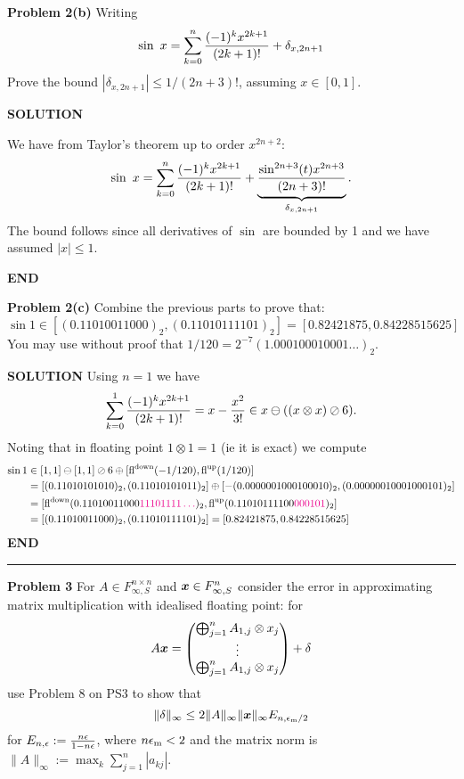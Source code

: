 \documentclass[12pt,a4paper]{article}
\def\x{ {\vc x} }
\def\magenta#1{ {\color{magenta} #1} }
\begin{document}
\textbf{Problem 2(b)} Writing
\[
\sin\ x = \ensuremath{\sum}_{k=0}^n {(-1)^k x^{2k+1} \over (2k+1)!} + \ensuremath{\delta}_{x,2n+1}
\]
Prove the bound $|\ensuremath{\delta}_{x,2n+1}| \ensuremath{\leq} 1/(2n+3)!$, assuming $x \ensuremath{\in} [0,1]$.

\textbf{SOLUTION}

We have from Taylor's theorem up to order $x^{2n+2}$:
\[
\sin\ x = \ensuremath{\sum}_{k=0}^n {(-1)^k x^{2k+1} \over (2k+1)!} + \underbrace{{\sin^{2n+3}(t) x^{2n+3} \over (2n+3)!}}_{\ensuremath{\delta}_{x,2n+1}}.
\]
The bound follows since all derivatives of $\sin$ are bounded by 1 and we have assumed $|x| \ensuremath{\leq} 1$.

\textbf{END}

\textbf{Problem 2(c)} Combine the previous parts to prove that:
\[
\sin 1 \ensuremath{\in} [(0.11010011000)_2, (0.11010111101)_2] = [0.82421875, 0.84228515625]
\]
You may use without proof that $1/120 = 2^{-7} (1.000100010001\ensuremath{\ldots})_2$.

\textbf{SOLUTION} Using $n = 1$ we have
\[
\ensuremath{\sum}_{k=0}^1 {(-1)^k x^{2k+1} \over (2k+1)!} = x - {x^2 \over 3!} \ensuremath{\in} x \ensuremath{\ominus} ((x \ensuremath{\otimes} x) \ensuremath{\oslash} 6).
\]
Noting that in floating point $1 \ensuremath{\otimes} 1 = 1$ (ie it is exact) we compute
\begin{align*}
\sin 1 &\ensuremath{\in} [1,1] \ensuremath{\ominus} [1,1] \ensuremath{\oslash} 6 \ensuremath{\oplus} [{\rm fl}^{\rm down}(-1/120), {\rm fl}^{\rm up}(1/120)] \ccr
 = [(0.11010101010)_2, (0.11010101011)_2] \ensuremath{\oplus} [-(0.0000001000100010)_2, (0.00000010001000101)_2] \ccr
  =
[{\rm fl}^{\rm down}(0.11010011000\magenta{11101111\ensuremath{\ldots}})_2,
 {\rm fl}^{\rm up}(0.11010111100\magenta{000101})_2] \ccr
 = [(0.11010011000)_2, (0.11010111101)_2] = [0.82421875, 0.84228515625]
\end{align*}
\textbf{END}

\rule{\textwidth}{1pt}
\textbf{Problem 3} For $A \ensuremath{\in} F_{\ensuremath{\infty},S}^{n \ensuremath{\times} n}$ and $\ensuremath{\bm{\x}} \ensuremath{\in} F_{\ensuremath{\infty},S}^n$ consider the error in approximating matrix multiplication with idealised floating point: for
\[
A \ensuremath{\bm{\x}} =  \begin{pmatrix}
\ensuremath{\bigoplus}_{j=1}^n A_{1,j} \ensuremath{\otimes} x_j\\
\ensuremath{\vdots} \\
\ensuremath{\bigoplus}_{j=1}^n A_{1,j} \ensuremath{\otimes} x_j
\end{pmatrix} + \ensuremath{\delta}
\]
use Problem 8 on PS3 to show that
\[
\| \ensuremath{\delta} \|_\ensuremath{\infty} \ensuremath{\leq} 2 \|A\|_\ensuremath{\infty} \| \ensuremath{\bm{\x}} \|_\ensuremath{\infty} E_{n,\ensuremath{\epsilon}_{\rm m}/2}
\]
for $E_{n,\ensuremath{\epsilon}} := {n \ensuremath{\epsilon} \over 1-n\ensuremath{\epsilon}}$, where  $n \ensuremath{\epsilon}_{\rm m} < 2$ and the matrix norm is $\|A \|_\ensuremath{\infty} := \max_k \ensuremath{\sum}_{j=1}^n |a_{kj}|$.
\end{document}
